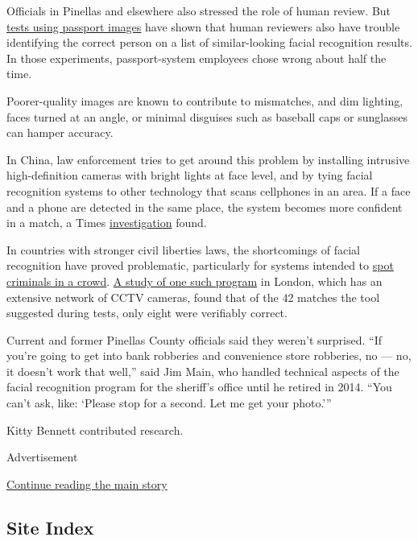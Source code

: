 Officials in Pinellas and elsewhere also stressed the role of human
review. But
\href{https://journals.plos.org/plosone/article?id=10.1371/journal.pone.0139827}{tests
using passport images} have shown that human reviewers also have trouble
identifying the correct person on a list of similar-looking facial
recognition results. In those experiments, passport-system employees
chose wrong about half the time.

Poorer-quality images are known to contribute to mismatches, and dim
lighting, faces turned at an angle, or minimal disguises such as
baseball caps or sunglasses can hamper accuracy.

In China, law enforcement tries to get around this problem by installing
intrusive high-definition cameras with bright lights at face level, and
by tying facial recognition systems to other technology that scans
cellphones in an area. If a face and a phone are detected in the same
place, the system becomes more confident in a match, a Times
\href{https://www.nytimes.com/2019/12/17/technology/china-surveillance.html}{investigation}
found.

In countries with stronger civil liberties laws, the shortcomings of
facial recognition have proved problematic, particularly for systems
intended to
\href{https://www.orlandoweekly.com/Blogs/archives/2019/07/18/orlando-cancels-amazon-rekognition-capping-15-months-of-glitches-and-controversy}{spot
criminals in a crowd}.
\href{https://48ba3m4eh2bf2sksp43rq8kk-wpengine.netdna-ssl.com/wp-content/uploads/2019/07/London-Met-Police-Trial-of-Facial-Recognition-Tech-Report.pdf}{A
study of one such program} in London, which has an extensive network of
CCTV cameras, found that of the 42 matches the tool suggested during
tests, only eight were verifiably correct.

Current and former Pinellas County officials said they weren't
surprised. ``If you're going to get into bank robberies and convenience
store robberies, no --- no, it doesn't work that well,'' said Jim Main,
who handled technical aspects of the facial recognition program for the
sheriff's office until he retired in 2014. ``You can't ask, like:
`Please stop for a second. Let me get your photo.'''

Kitty Bennett contributed research.

Advertisement

\protect\hyperlink{after-bottom}{Continue reading the main story}

\hypertarget{site-index}{%
\subsection{Site Index}\label{site-index}}

